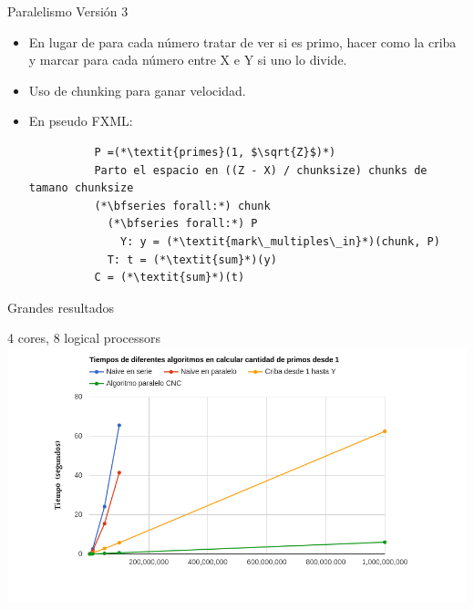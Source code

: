 \documentclass[compress]{beamer}
\begin{document}
\begin{frame}[fragile]{Paralelismo Versión 3}
  \begin{itemize}
    \setlength\itemsep{1em}
    \item<1-> En lugar de para cada número tratar de ver si es primo, hacer como la criba y marcar para cada número entre X e Y si uno lo divide.
    \item<2-> Uso de chunking para ganar velocidad.
    \item<3-> En pseudo FXML:
      \begin{lstlisting}
          P =(*\textit{primes}(1, $\sqrt{Z}$)*)
          Parto el espacio en ((Z - X) / chunksize) chunks de tamano chunksize
          (*\bfseries forall:*) chunk
            (*\bfseries forall:*) P
              Y: y = (*\textit{mark\_multiples\_in}*)(chunk, P)
            T: t = (*\textit{sum}*)(y)
          C = (*\textit{sum}*)(t)
      \end{lstlisting}
  \end{itemize}
\end{frame}

\begin{frame}{Grandes resultados}
  \begin{center}
  {4 cores, 8 logical processors}
  \\
  \includegraphics[width=1.15\textwidth]{imagenes/todoJulian.png}%
  \end{center}
\end{frame}
\end{document}
